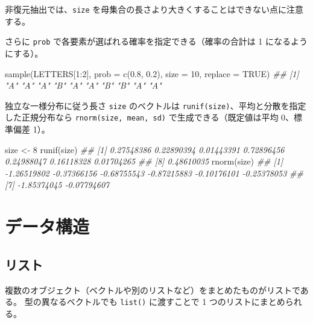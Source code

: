 \documentclass[
  letterpaper,
  xelatex,
  ja=standard, xelatex]{bxjsbook}
\newenvironment{Shaded}{\begin{snugshade}}{\end{snugshade}}
\newcommand{\AttributeTok}[1]{\textcolor[rgb]{0.40,0.45,0.13}{#1}}
\newcommand{\ConstantTok}[1]{\textcolor[rgb]{0.56,0.35,0.01}{#1}}
\newcommand{\DecValTok}[1]{\textcolor[rgb]{0.68,0.00,0.00}{#1}}
\newcommand{\DocumentationTok}[1]{\textcolor[rgb]{0.37,0.37,0.37}{\textit{#1}}}
\newcommand{\FloatTok}[1]{\textcolor[rgb]{0.68,0.00,0.00}{#1}}
\newcommand{\FunctionTok}[1]{\textcolor[rgb]{0.28,0.35,0.67}{#1}}
\newcommand{\NormalTok}[1]{\textcolor[rgb]{0.00,0.23,0.31}{#1}}
\newcommand{\OtherTok}[1]{\textcolor[rgb]{0.00,0.23,0.31}{#1}}
\newcommand{\SpecialCharTok}[1]{\textcolor[rgb]{0.37,0.37,0.37}{#1}}
\begin{document}
非復元抽出では、\texttt{size}
を母集合の長さより大きくすることはできない点に注意する。

さらに \texttt{prob} で各要素が選ばれる確率を指定できる（確率の合計は 1
になるようにする）。

\begin{Shaded}
\begin{Highlighting}[]
\FunctionTok{sample}\NormalTok{(LETTERS[}\DecValTok{1}\SpecialCharTok{:}\DecValTok{2}\NormalTok{], }\AttributeTok{prob =} \FunctionTok{c}\NormalTok{(}\FloatTok{0.8}\NormalTok{, }\FloatTok{0.2}\NormalTok{), }\AttributeTok{size =} \DecValTok{10}\NormalTok{, }\AttributeTok{replace =} \ConstantTok{TRUE}\NormalTok{)}
\DocumentationTok{\#\#  [1] "A" "A" "A" "B" "A" "A" "B" "B" "A" "A"}
\end{Highlighting}
\end{Shaded}

独立な一様分布に従う長さ \texttt{size} のベクトルは
\texttt{runif(size)}、平均と分散を指定した正規分布なら
\texttt{rnorm(size,\ mean,\ sd)} で生成できる（既定値は平均 0、標準偏差
1）。

\begin{Shaded}
\begin{Highlighting}[]
\NormalTok{size }\OtherTok{\textless{}{-}} \DecValTok{8}
\FunctionTok{runif}\NormalTok{(size)}
\DocumentationTok{\#\# [1] 0.27548386 0.22890394 0.01443391 0.72896456 0.24988047 0.16118328 0.01704265}
\DocumentationTok{\#\# [8] 0.48610035}
\FunctionTok{rnorm}\NormalTok{(size)}
\DocumentationTok{\#\# [1] {-}1.26519802 {-}0.37366156 {-}0.68755543 {-}0.87215883 {-}0.10176101 {-}0.25378053}
\DocumentationTok{\#\# [7] {-}1.85374045 {-}0.07794607}
\end{Highlighting}
\end{Shaded}


\chapter{データ構造}\label{ux30c7ux30fcux30bfux69cbux9020}

\section{リスト}\label{ux30eaux30b9ux30c8}

複数のオブジェクト（ベクトルや別のリストなど）をまとめたものがリストである。
型の異なるベクトルでも \texttt{list()} に渡すことで 1
つのリストにまとめられる。
\end{document}
